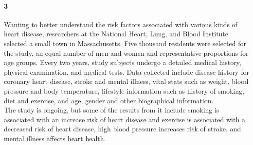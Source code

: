 \documentclass{article}
\begin{document}
\begin{flushleft}
\newpage
\paragraph{3} Wanting to better understand the risk factors associated with various kinds of heart disease, researchers at the National Heart, Lung, and Blood Institute selected a small town in Massachusetts. Five thousand residents were selected for the study, an equal number of men and women and representative proportions for age groups. Every two years, study subjects undergo a detailed medical history, physical examination, and medical tests. Data collected include disease history for coronary heart disease, stroke and mental illness, vital stats such as weight, blood pressure and body temperature, lifestyle information such as history of smoking, diet and exercise, and age, gender and other biographical information.\\
\medskip
The study is ongoing, but some of the results from it include smoking is associated with an increase risk of heart disease and exercise is associated with a decreased risk of heart disease, high blood pressure increases risk of stroke, and mental illness affects heart health.


\end{flushleft}
\end{document}
